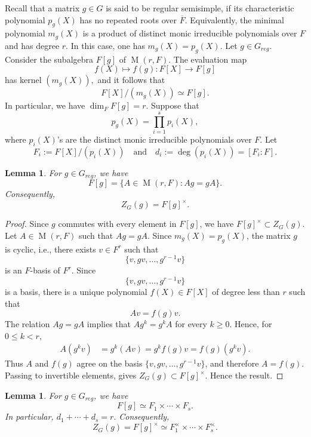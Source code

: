 \documentclass[11pt, a4paper, reqno]{amsart}
\newtheorem{lemma}[theorem]{Lemma}
\theoremstyle{definition}
\theoremstyle{remark}
\theoremstyle{example}
\theoremstyle{note}
\numberwithin{equation}{section}
\DeclareMathOperator{\M}{M}
\begin{document}
Recall that a matrix $g\in G$ is said to be regular semisimple, if its characteristic polynomial $p_g(X)$ has no repeated roots
over $\overline F$.  Equivalently, the minimal polynomial $m_g(X)$ is a product of distinct monic irreducible polynomials over $F$ and has degree $r$. In this case, one has $m_g(X)= p_g(X).$ Let $g\in G_{reg}$. Consider the subalgebra $F[g]$ of $\M(r,F)$.   
The evaluation map $$f(X) \longmapsto f(g): F[X]\longrightarrow F[g]$$ has kernel
$(m_g(X)),$ and it follows that
\[
F[X]/(m_g(X)) \simeq F[g].
\]
In particular, we have $\dim_F F[g]=r.$ Suppose that   
\[
p_g(X)= \prod_{i=1}^{s} p_i(X),
\]
where $p_{i}(X)$'s are the distinct monic irreducible polynomials over $F$. Let
\begin{equation*}
F_i:=F[X]/(p_i(X)) \quad \text{and} \quad d_i:=\deg (p_i(X)) =[F_i:F].
\end{equation*}



\begin{lemma}\label{lem:centralizer-Fg} For $g \in G_{reg}$, we have
\[
F[g] = \{A\in \M(r,F):Ag=gA\}.
\]
Consequently,
\[
Z_{G}(g)=F[g]^{\times}.
\]
\end{lemma}

\begin{proof} Since $g$ commutes with every element in $F[g]$, we have $F[g]^{\times}\subset Z_{G}(g)$. Let $A\in \M(r,F)$ such that $Ag=gA$. Since $m_g(X)=p_g(X)$, the matrix $g$ is cyclic, i.e., there exists $v\in F^r$
such that
\[
\{v,gv,\ldots,g^{r-1}v \}
\]
is an $F$-basis of $F^r$.
Since
\[
\{v,gv,\ldots,g^{r-1}v \}
\]
is a basis, there is a unique polynomial $f(X) \in F[X]$ of degree less than $r$ such
that
\[
Av=f(g)v.
\]
The relation $Ag=gA$ implies that $Ag^{k}=g^{k}A$ for every $k\geq 0$.  Hence, for
$0\leq k<r$,
\begin{align*}
A(g^{k}v)
&=g^{k}(Av)=g^{k}f(g)v=f(g)(g^{k}v).
\end{align*}
Thus $A$ and $f(g)$ agree on the basis
$\{v,gv,\ldots,g^{r-1}v \}$, and therefore $A=f(g)$.  Passing to invertible
elements, gives $Z_G(g)\subset F[g]^{\times}$. Hence the result.
\end{proof}

\begin{lemma}\label{identifying F[g]^x as a product of Fi's} For $g \in G_{reg}$, we have   
$$F[g]\simeq F_1\times\cdots\times F_s.$$ 
In particular, $d_{1}+\cdots+d_{s}=r.$ Consequently,
\[
Z_{G}(g)=F[g]^{\times}\simeq F_{1}^{\times} \times \cdots \times F_{s}^{\times}.
\]
\end{lemma}
\end{document}
